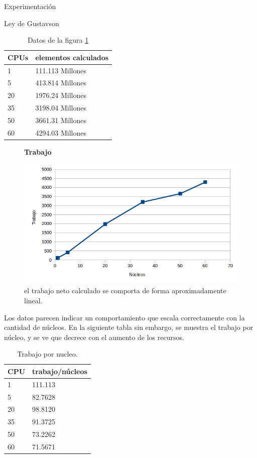 \begin{section}{Experimentación}
\begin{subsection}{Ley de Gustavson}
\begin{center}
\begin{table}[h]
    \begin{tabular}{ | l | l |}
    \hline
CPUs   & elementos calculados \\ \hline
1      & 111.113 Millones \\ \hline
5      & 413.814 Millones \\ \hline
20     & 1976.24 Millones \\ \hline
35     & 3198.04 Millones \\ \hline
50     & 3661.31 Millones \\ \hline
60     & 4294.03 Millones \\ \hline
    \end{tabular}
    \caption{Datos de la figura \ref{fig:exp_gustafson_work}}
\end{table}
\end{center}



\begin{figure}
\textbf{Trabajo}\par\medskip

\includegraphics[width=.75\textwidth,height=.75\textheight,keepaspectratio]{figures/exp_gustafson_work}
\caption{el trabajo neto calculado se comporta de forma aproximadamente lineal.}
\label{fig:exp_gustafson_work}
\end{figure}
Los datos parecen indicar un comportamiento que escala correctamente con la cantidad de núcleos. En la siguiente tabla sin embargo, se muestra el trabajo por núcleo, y se ve que decrece con el aumento de los recursos.


\begin{center}
\begin{table}[h]
    \begin{tabular}{ | l | l |}
    \hline
CPU   & trabajo/núcleos \\ \hline
1     &  111.113 \\ \hline
5     &  82.7628 \\ \hline
20    &  98.8120 \\ \hline
35    &  91.3725 \\ \hline
50    &  73.2262 \\ \hline
60    &  71.5671 \\ \hline
    \end{tabular}
    \caption{Trabajo por nucleo. }
\end{table}
\end{center}




\end{subsection}
\end{section}

